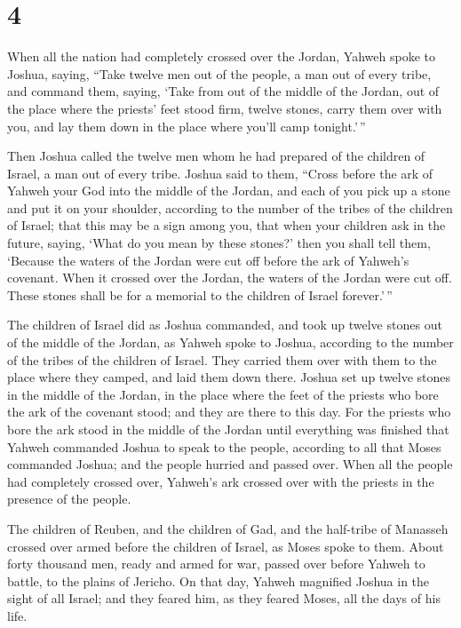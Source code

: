 \hypertarget{section-3}{%
\section{4}\label{section-3}}

 When all the nation had completely crossed over the
Jordan, Yahweh spoke to Joshua, saying,  ``Take twelve men
out of the people, a man out of every tribe,  and command
them, saying, `Take from out of the middle of the Jordan, out of the
place where the priests' feet stood firm, twelve stones, carry them over
with you, and lay them down in the place where you'll camp tonight.'\,''

 Then Joshua called the twelve men whom he had prepared of
the children of Israel, a man out of every tribe.  Joshua
said to them, ``Cross before the ark of Yahweh your God into the middle
of the Jordan, and each of you pick up a stone and put it on your
shoulder, according to the number of the tribes of the children of
Israel;  that this may be a sign among you, that when your
children ask in the future, saying, `What do you mean by these stones?'
 then you shall tell them, `Because the waters of the
Jordan were cut off before the ark of Yahweh's covenant. When it crossed
over the Jordan, the waters of the Jordan were cut off. These stones
shall be for a memorial to the children of Israel forever.'\,''

 The children of Israel did as Joshua commanded, and took
up twelve stones out of the middle of the Jordan, as Yahweh spoke to
Joshua, according to the number of the tribes of the children of Israel.
They carried them over with them to the place where they camped, and
laid them down there.  Joshua set up twelve stones in the
middle of the Jordan, in the place where the feet of the priests who
bore the ark of the covenant stood; and they are there to this day.
 For the priests who bore the ark stood in the middle of
the Jordan until everything was finished that Yahweh commanded Joshua to
speak to the people, according to all that Moses commanded Joshua; and
the people hurried and passed over.  When all the people
had completely crossed over, Yahweh's ark crossed over with the priests
in the presence of the people.

 The children of Reuben, and the children of Gad, and the
half-tribe of Manasseh crossed over armed before the children of Israel,
as Moses spoke to them.  About forty thousand men, ready
and armed for war, passed over before Yahweh to battle, to the plains of
Jericho.  On that day, Yahweh magnified Joshua in the
sight of all Israel; and they feared him, as they feared Moses, all the
days of his life.

